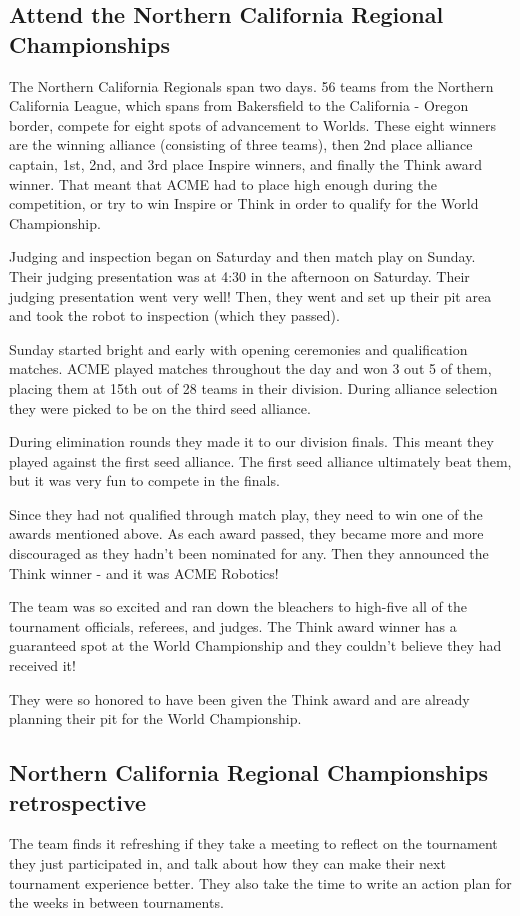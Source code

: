 \documentclass{article}
\begin{document}
\subsection{Attend the Northern California Regional Championships}
The Northern California Regionals span two days. 56 teams from the Northern California League, which spans from Bakersfield to the California - Oregon border, compete for eight spots of advancement to Worlds. These eight winners are the winning alliance (consisting of three teams), then 2nd place alliance captain, 1st, 2nd, and 3rd place Inspire winners, and finally the Think award winner. That meant that ACME had to place high enough during the competition, or try to win Inspire or Think in order to qualify for the World Championship. 

Judging and inspection began on Saturday and then match play on Sunday. Their judging presentation was at 4:30 in the afternoon on Saturday. Their judging presentation went very well! Then, they went and set up their pit area and took the robot to inspection (which they passed). 

Sunday started bright and early with opening ceremonies and qualification matches. ACME played matches throughout the day and won 3 out 5 of them, placing them at 15th out of 28 teams in their division. During alliance selection they were picked to be on the third seed alliance. 

During elimination rounds they made it to our division finals. This meant they played against the first seed alliance. The first seed alliance ultimately beat them, but it was very fun to compete in the finals. 

Since they had not qualified through match play, they need to win one of the awards mentioned above. As each award passed, they became more and more discouraged as they hadn't been nominated for any. Then they announced the Think winner - and it was ACME Robotics! 

The team was so excited and ran down the bleachers to high-five all of the tournament officials, referees, and judges. The Think award winner has a guaranteed spot at the World Championship and they couldn't believe they had received it! 

They were so honored to have been given the Think award and are already planning their pit for the World Championship. 

\subsection{Northern California Regional Championships retrospective}
The team finds it refreshing if they take a meeting to reflect on the tournament they just participated in, and talk about how they can make their next tournament experience better. They also take the time to write an action plan for the weeks in between tournaments. 
\end{document}
